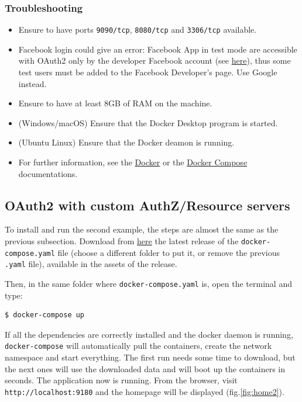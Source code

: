 \subsubsection{Troubleshooting}
\begin{itemize}
    \item Ensure to have ports \texttt{9090/tcp}, \texttt{8080/tcp} and \texttt{3306/tcp} available.
    \item Facebook login could give an error: Facebook App in test mode are accessible with OAuth2 only by the developer Facebook account (see \href{https://developers.facebook.com/docs/apps/managing-development-cycle/#step1}{here}), thus some test users must be added to the Facebook Developer's page. Use Google instead.
    \item Ensure to have at least 8GB of RAM on the machine.
    \item (Windows/macOS) Ensure that the Docker Desktop program is started.
    \item (Ubuntu Linux) Ensure that the Docker deamon is running.
    \item For further information, see the \href{https://docs.docker.com/}{Docker} or the \href{https://docs.docker.com/compose/}{Docker Compose} documentations.
\end{itemize}

\newpage

\subsection{OAuth2 with custom AuthZ/Resource servers}
To install and run the second example, the steps are almost the same as the previous subsection. Download from \href{https://github.com/nopesir/oauth-hw-security-custom/releases}{here} the latest release of the \texttt{docker-compose.yaml} file (choose a different folder to put it, or remove the previous \texttt{.yaml} file), available in the assets of the release.

\noindent Then, in the same folder where \texttt{docker-compose.yaml} is, open the terminal and type:
\begin{lstlisting}[language=bash]
  $ docker-compose up
\end{lstlisting}

\noindent If all the dependencies are correctly installed and the docker daemon is running, \texttt{docker-compose} will automatically pull the containers, create the network namespace and start everything. 
The first run needs some time to download, but the next ones will use the downloaded data and will boot up the containers in seconds. The application now is running. From the browser, visit \texttt{http://localhost:9180} and the homepage will be displayed (fig.\ref{fig:home2}).

